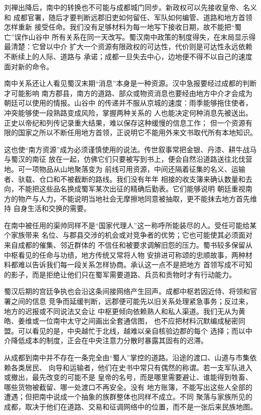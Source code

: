 刘禅出降后，南中的转换也不可能与成都城门同步。新政权可以先接收皇帝、名义和
成都官署，随后才要判断远郡旧吏如何留任、军队如何编管、道路和地方首领怎样重新
接受任命。我们没有足够材料为每一地写下接收日期，故不能把“蜀亡”误作山谷中
所有关系在同一天改写。蜀汉南中政策的制度得失，在末局显示得最清楚：它曾以中介
扩大一个资源有限政权的可达性，代价则是可达性永远依赖不断续上的人际、道路与
承诺；成都一旦失去中心，边地便不得不以自己的速度面对新的命令。

南中关系还让人看见蜀汉末期“消息”本身是一种资源。汉中急报要经过成都的判断才可能影响
南方郡县，南方的道路、部众或物资消息也要经由地方中介才会成为朝廷可以使用的情报。山谷中
的传递并不服从京城的速度：雨季能够拖住使者，冲突能够使一段熟路变成风险，掌握两种关系的
人也能决定何种消息先被送出。正史以帝纪和列传记录重大结果，难以保存这种缓慢的信息工作；
但一个资源有限的国家之所以不断任用地方首领，正说明它不能用外来文书取代所有本地知识。

这也使“南方资源”成为必须谨慎使用的说法。传世叙事常把金银、丹漆、耕牛战马与蜀汉的南征
放在一起，仿佛它们只要被写到书上，便会自然沿道路送往北伐营地。可一项物品从山地聚落变为
前线可用资源，中间还隔着征集的名义、运输者、驮载、仓口和不被截断的路线。我们没有年年
相接的收支簿来确认数量和去向，不能把这些品名换成蜀军某次出征的精确后勤表。它们能够说明
朝廷重视南方的物产与人力，不能说明当地社会无摩擦地同意被抽取，更不能抹去地方首先维持
自身生活和交换的需要。

在南中被任用的渠帅同样不是“国家代理人”这一称呼所能装尽的人。受任可能给某个家族带来
名位、与郡县交涉的机会或对竞争者的优势；它也可能使其必须面对来自成都的催集、邻近群体的
不信任和被要求调解旧怨的压力。蜀书较多保留从中枢看见的任命与功绩，地方传统又常将人物
安排进可称颂的忠顺故事，两种材料都难以告诉我们每一段关系怎样协商。承认这一点不是把地方
首领写成不可知的影子，而是拒绝让他们只在蜀军需要道路、兵员和贡物时才有行动能力。

蜀汉后期的宫廷争执也会沿这条间接网络产生回声。成都中枢若因近侍、将领和官署之间的信息
竞争而延缓判断，远郡便可能先以旧关系处理紧急事务；反过来，地方的迟报或不同说法又会让
中枢更倾向依赖熟人和私人渠道。我们无从为黄皓、姜维或一位南中太守之间画出全套通信图，
也不应把材料沉默编成秘密同盟。可以看见的是，中央越忙于北线，越难以亲自核验边郡的每个
选择；而以中介降低成本的制度，正会在中央注意力分散时暴露其固有的迟滞。

从成都到南中并不存在一条完全由“蜀人”掌控的道路。沿途的渡口、山道与市集依赖各类居民、
向导和运输者，他们在史书中常只有偶然的称谓。若一支军队进入或撤出，最先改变的可能不是
皇帝的名号，而是哪里需要避让、谁能得到牲畜、哪些货物被截留、哪一处渡口不再安全。没有
地方账簿，不能写出这些人全部的遭遇；但把南中说成一个抽象的族群整体也同样不成立。不同
聚落与家族所见的成都，取决于他们在道路、交易和征调网络中的位置，而不是一张后来民族地图。

